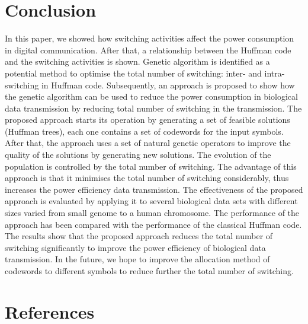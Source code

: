 \documentclass[preprint,12pt]{elsarticle}
\begin{document}
\section{Conclusion}
In this paper, we showed how switching activities affect the power consumption in digital communication. After that, a relationship between the Huffman code and the switching activities is shown. Genetic
algorithm is identified as a potential method to optimise the total number of  switching: inter- and intra-switching in Huffman code.  Subsequently, an approach is proposed to show how the genetic algorithm can be used to reduce the power consumption in biological data transmission by reducing total number of switching in the  transmission. The proposed approach starts its operation by generating a set of feasible solutions (Huffman trees), each one contains a set of codewords for the input symbols. After that, the approach uses a set of natural genetic operators to improve the quality of the solutions by generating new solutions. The evolution of the population is controlled by the total number of switching. The advantage of this approach is that it minimises the total number of switching considerably, thus increases the power efficiency data transmission.   
The effectiveness of the proposed approach is evaluated by applying it to several biological data sets with different sizes varied from small genome to a human chromosome. The performance of the approach has been compared with the performance of the classical Huffman code. The results show that the proposed approach reduces the total number of switching significantly to improve the power efficiency of biological data transmission. %
In the future, we hope to improve the allocation method of codewords to different symbols to reduce further the total number of switching.





\section*{References}


\end{document}
